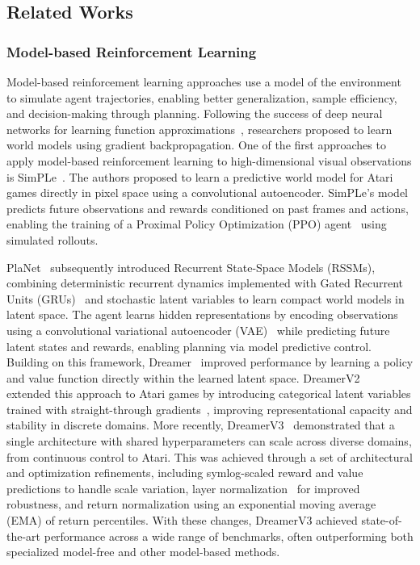 \subsection{Related Works}

\subsubsection{Model-based Reinforcement Learning}

Model-based reinforcement learning approaches use a model of the environment to simulate agent trajectories, enabling better generalization, sample efficiency, and decision-making through planning. Following the success of deep neural networks for learning function approximations~\citep{lecun2015deep}, researchers proposed to learn world models using gradient backpropagation. One of the first approaches to apply model-based reinforcement learning to high-dimensional visual observations is SimPLe~\citep{kaiser2019model}. The authors proposed to learn a predictive world model for Atari games directly in pixel space using a convolutional autoencoder. SimPLe's model predicts future observations and rewards conditioned on past frames and actions, enabling the training of a Proximal Policy Optimization (PPO) agent~\citep{schulman2017proximal} using simulated rollouts.

PlaNet~\citep{hafner2019learning} subsequently introduced Recurrent State-Space Models (RSSMs), combining deterministic recurrent dynamics implemented with Gated Recurrent Units (GRUs)~\citep{cho2014learning} and stochastic latent variables to learn compact world models in latent space. The agent learns hidden representations by encoding observations using a convolutional variational autoencoder (VAE)~\citep{kingma2014auto} while predicting future latent states and rewards, enabling planning via model predictive control. Building on this framework, Dreamer~\citep{hafner2019dream} improved performance by learning a policy and value function directly within the learned latent space. DreamerV2~\citep{hafner2020mastering} extended this approach to Atari games by introducing categorical latent variables trained with straight-through gradients~\citep{bengio2013estimating}, improving representational capacity and stability in discrete domains. More recently, DreamerV3~\citep{hafner2023mastering} demonstrated that a single architecture with shared hyperparameters can scale across diverse domains, from continuous control to Atari. This was achieved through a set of architectural and optimization refinements, including symlog-scaled reward and value predictions to handle scale variation, layer normalization~\citep{ba2016layer} for improved robustness, and return normalization using an exponential moving average (EMA) of return percentiles. With these changes, DreamerV3 achieved state-of-the-art performance across a wide range of benchmarks, often outperforming both specialized model-free and other model-based methods.

